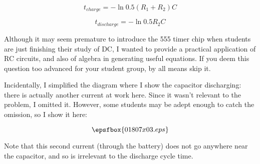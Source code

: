 
$$t_{charge} = - \ln 0.5 (R_1 + R_2)C$$

$$t_{discharge} = - \ln 0.5 R_2 C$$







Although it may seem premature to introduce the 555 timer chip when students are just finishing their study of DC, I wanted to provide a practical application of RC circuits, and also of algebra in generating useful equations.  If you deem this question too advanced for your student group, by all means skip it.

Incidentally, I simplified the diagram where I show the capacitor discharging: there is actually another current at work here.  Since it wasn't relevant to the problem, I omitted it.  However, some students may be adept enough to catch the omission, so I show it here:

$$\epsfbox{01807x03.eps}$$

Note that this second current (through the battery) does not go anywhere near the capacitor, and so is irrelevant to the discharge cycle time.




